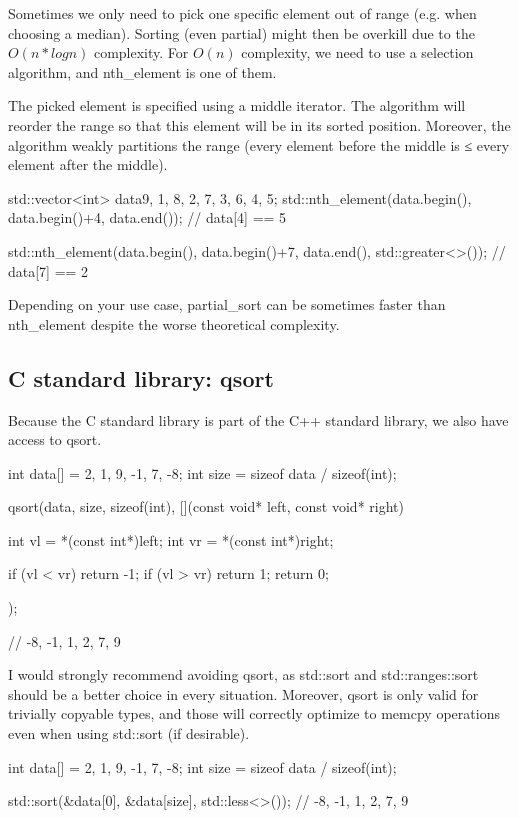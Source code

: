 Sometimes we only need to pick one specific element out of range (e.g. when choosing a median). Sorting (even partial) might then be overkill due to the $O(n*logn)$ complexity. For $O(n)$ complexity, we need to use a selection algorithm, and nth\_element is one of them.



The picked element is specified using a middle iterator. The algorithm will reorder the range so that this element will be in its sorted position. Moreover, the algorithm weakly partitions the range (every element before the middle is ≤ every element after the middle).

\begin{box-note}
\begin{cppcode}
std::vector<int> data{9, 1, 8, 2, 7, 3, 6, 4, 5};
std::nth_element(data.begin(), data.begin()+4, data.end());
// data[4] == 5

std::nth_element(data.begin(), data.begin()+7, data.end(), std::greater<>());
// data[7] == 2
\end{cppcode}
\end{box-note}

Depending on your use case, partial\_sort can be sometimes faster than nth\_element despite the worse theoretical complexity.

\subsection{C standard library: qsort}

Because the C standard library is part of the C++ standard library, we also have access to qsort.

\begin{box-note}
\begin{cppcode}
int data[] = {2, 1, 9, -1, 7, -8};
int size = sizeof data / sizeof(int);

qsort(data, size, sizeof(int), [](const void* left, const void* right){
    int vl = *(const int*)left;
    int vr = *(const int*)right;

    if (vl < vr) return -1;
    if (vl > vr) return 1;
    return 0;
});

// -8, -1, 1, 2, 7, 9
\end{cppcode}
\end{box-note}

I would strongly recommend avoiding qsort, as std::sort and std::ranges::sort should be a better choice in every situation. Moreover, qsort is only valid for trivially copyable types, and those will correctly optimize to memcpy operations even when using std::sort (if desirable).

\begin{box-note}
\begin{cppcode}
int data[] = {2, 1, 9, -1, 7, -8};
int size = sizeof data / sizeof(int);

std::sort(&data[0], &data[size], std::less<>());
// -8, -1, 1, 2, 7, 9
\end{cppcode}
\end{box-note}